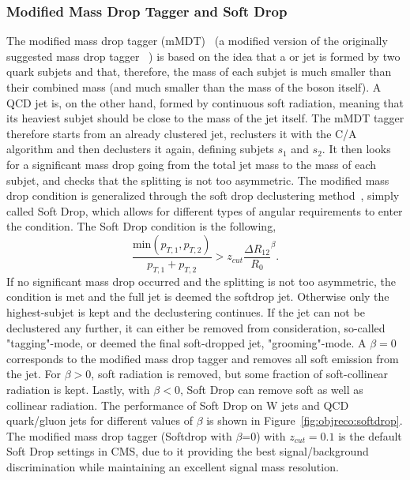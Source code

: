 \subsubsection{Modified Mass Drop Tagger and Soft Drop}
\label{sec:objreco:softdrop}
The modified mass drop tagger (mMDT)~\cite{Dasgupta:2013ihk} (a modified version of the originally suggested mass drop tagger ~\cite{Butterworth:2008iy}) is based on the idea that a \PW or \PZ jet is formed by two quark subjets and that, therefore, the mass of each subjet is much smaller than their combined mass (and much smaller than the mass of the boson itself). A QCD jet is, on the other hand, formed by continuous soft radiation, meaning that its heaviest subjet should be close to the mass of the jet itself. The mMDT tagger therefore starts from an already clustered jet, reclusters it with the C/A algorithm and then declusters it again, defining subjets $s_1$ and $s_2$. It then looks for a significant mass drop going from the total jet mass to the mass of each subjet, and checks that the splitting is not too asymmetric. The modified mass drop condition is generalized through the soft drop declustering method~\cite{Larkoski:2014wba}, simply called Soft Drop, which allows for different types of angular requirements to enter the condition. The Soft Drop condition is the following,
\begin{equation}
  \label{eq:softdrop}
\frac{ \textrm{min}(p_{T,1},p_{T,2}) }{ p_{T,1}+p_{T,2} } > z_{cut} \frac{\Delta R_{12}}{R_0}^\beta.
\end{equation}
If no significant mass drop occurred and the splitting is not too asymmetric, the condition is met and the full jet is deemed the softdrop jet. Otherwise only the highest-\PT subjet is kept and the declustering continues. If the jet can not be declustered any further, it can either be removed from consideration, so-called "tagging"-mode, or deemed the final soft-dropped jet, "grooming"-mode. A $\beta=0$ corresponds to the modified mass drop tagger and removes all soft emission from the jet. For $\beta>0$, soft radiation is removed, but some fraction of soft-collinear radiation is kept. Lastly, with $\beta<0$, Soft Drop can remove soft as well as collinear radiation.
The performance of Soft Drop on W jets and QCD quark/gluon jets for different values of $\beta$ is shown in Figure~\ref{fig:objreco:softdrop}. The modified mass drop tagger (Softdrop with $\beta$=0) with $z_{cut} = 0.1$ is the default Soft Drop settings in CMS, due to it providing the best signal/background discrimination while maintaining an excellent signal mass resolution. 
